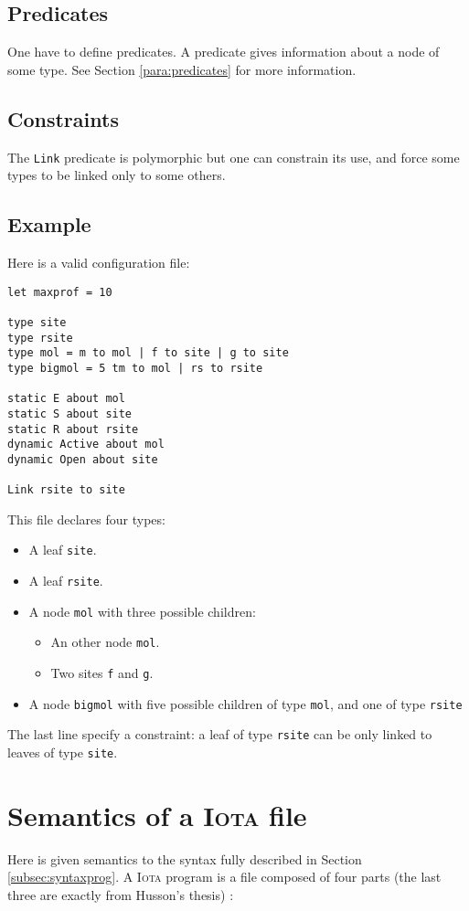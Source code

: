 \documentclass[10pt,a4paper]{article}
\newcommand\Iota{\textsc{Iota}}
\newcommand{\ocaml}{\texttt}
\begin{document}
\subsection{Predicates}
\label{subsec:predicates}
One have to define predicates. A predicate gives information about a node of some type. See Section \ref{para:predicates} for more information.

\subsection{Constraints}
The \ocaml{Link} predicate is polymorphic but one can constrain its use, and force some types to be linked only to some others.

\subsection{Example}
Here is a valid configuration file:
\begin{verbatim}
let maxprof = 10

type site
type rsite
type mol = m to mol | f to site | g to site
type bigmol = 5 tm to mol | rs to rsite

static E about mol
static S about site
static R about rsite
dynamic Active about mol
dynamic Open about site

Link rsite to site
\end{verbatim}

This file declares four types:

\begin{itemize}
\item A leaf \ocaml{site}.
\item A leaf \ocaml{rsite}.
\item A node \ocaml{mol} with three possible children:
  \begin{itemize}
  \item An other node \ocaml{mol}.
  \item Two sites \ocaml{f} and \ocaml{g}.
  \end{itemize}
\item A node \ocaml{bigmol} with five possible children of type \ocaml{mol}, and one of type \ocaml{rsite}
\end{itemize}

The last line specify a constraint: a leaf of type \ocaml{rsite} can be only linked to leaves of type \ocaml{site}.

\section{Semantics of a \Iota{} file}
Here is given semantics to the syntax fully described in Section \ref{subsec:syntaxprog}. A \Iota{} program is a file composed of four parts (the last three are exactly from Husson's thesis) :
\end{document}
